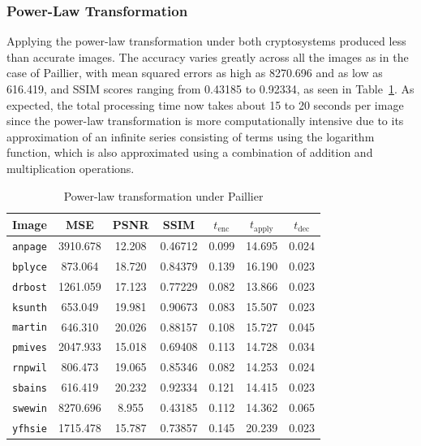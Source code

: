 \subsubsection{Power-Law Transformation}
Applying the power-law transformation under both cryptosystems produced less than accurate images. The accuracy varies greatly across all the images as in the case of Paillier, with mean squared errors as high as 8270.696 and as low as 616.419, and SSIM scores ranging from 0.43185 to 0.92334, as seen in Table~\ref{tbl:pwr-pal}. As expected, the total processing time now takes about 15 to 20 seconds per image since the power-law transformation is more computationally intensive due to its approximation of an infinite series consisting of terms using the logarithm function, which is also approximated using a combination of addition and multiplication operations.

\begin{table}[h]
	\centering
	\caption{Power-law transformation under Paillier}
	\label{tbl:pwr-pal}
    \begin{tabular}{lcccccc}
        \toprule
        Image & MSE  & PSNR & SSIM & $t_\text{enc}$ & $t_\text{apply}$ & $t_\text{dec}$ \\ \midrule
        \texttt{anpage} & 3910.678 & 12.208 & 0.46712 & 0.099 & 14.695 & 0.024 \\
		\texttt{bplyce} & 873.064 & 18.720 & 0.84379 & 0.139 & 16.190 & 0.023 \\
		\texttt{drbost} & 1261.059 & 17.123 & 0.77229 & 0.082 & 13.866 & 0.023 \\
		\texttt{ksunth} & 653.049 & 19.981 & 0.90673 & 0.083 & 15.507 & 0.023 \\
		\texttt{martin} & 646.310 & 20.026 & 0.88157 & 0.108 & 15.727 & 0.045 \\
		\texttt{pmives} & 2047.933 & 15.018 & 0.69408 & 0.113 & 14.728 & 0.034 \\
		\texttt{rnpwil} & 806.473 & 19.065 & 0.85346 & 0.082 & 14.253 & 0.024 \\
		\texttt{sbains} & 616.419 & 20.232 & 0.92334 & 0.121 & 14.415 & 0.023 \\
		\texttt{swewin} & 8270.696 & 8.955 & 0.43185 & 0.112 & 14.362 & 0.065 \\
		\texttt{yfhsie} & 1715.478 & 15.787 & 0.73857 & 0.145 & 20.239 & 0.023 \\
		\bottomrule
        \end{tabular}
\end{table}


